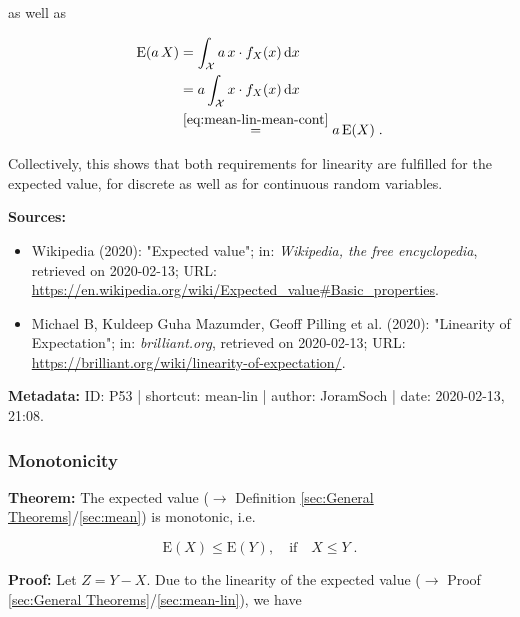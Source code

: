 \documentclass[a4paper,12pt,twoside]{book}
\begin{document}
as well as

\begin{equation} \label{eq:mean-lin-mean-lin-s2-cont}
\begin{split}
\mathrm{E}(a\,X) &= \int_{\mathcal{X}} a \, x \cdot f_X(x) \, \mathrm{d}x \\
&= a \int_{\mathcal{X}} x \cdot f_X(x) \, \mathrm{d}x \\
&\overset{\eqref{eq:mean-lin-mean-cont}}{=} a \, \mathrm{E}(X) \; .
\end{split}
\end{equation}

\vspace{1em}
Collectively, this shows that both requirements for linearity are fulfilled for the expected value, for discrete as well as for continuous random variables.


\vspace{1em}
\textbf{Sources:}
\begin{itemize}
\item Wikipedia (2020): "Expected value"; in: \textit{Wikipedia, the free encyclopedia}, retrieved on 2020-02-13; URL: \url{https://en.wikipedia.org/wiki/Expected_value#Basic_properties}.
\item Michael B, Kuldeep Guha Mazumder, Geoff Pilling et al. (2020): "Linearity of Expectation"; in: \textit{brilliant.org}, retrieved on 2020-02-13; URL: \url{https://brilliant.org/wiki/linearity-of-expectation/}.
\end{itemize}


\vspace{1em}
\textbf{Metadata:} ID: P53 | shortcut: mean-lin | author: JoramSoch | date: 2020-02-13, 21:08.
\vspace{1em}



\subsubsection[\textbf{Monotonicity}]{Monotonicity} \label{sec:mean-mono}
\setcounter{equation}{0}

\textbf{Theorem:} The expected value ($\rightarrow$ Definition \ref{sec:General Theorems}/\ref{sec:mean}) is monotonic, i.e.

\begin{equation} \label{eq:mean-mono-mean-mono}
\mathrm{E}(X) \leq \mathrm{E}(Y), \quad \text{if} \quad X \leq Y \; .
\end{equation}


\vspace{1em}
\textbf{Proof:} Let $Z = Y - X$. Due to the linearity of the expected value ($\rightarrow$ Proof \ref{sec:General Theorems}/\ref{sec:mean-lin}), we have
\end{document}
